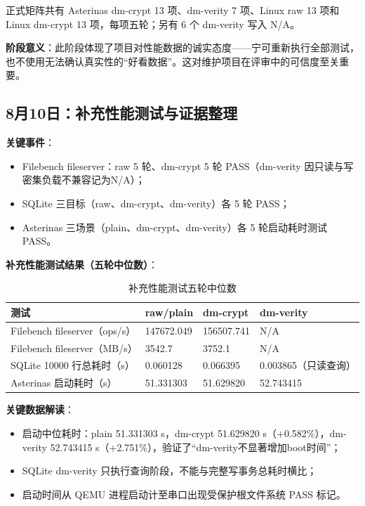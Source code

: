 正式矩阵共有 Asterinas dm-crypt 13 项、dm-verity 7 项、Linux raw 13 项和 Linux dm-crypt 13 项，每项五轮；另有 6 个 dm-verity 写入 N/A。

\textbf{阶段意义}：此阶段体现了项目对性能数据的诚实态度——宁可重新执行全部测试，也不使用无法确认真实性的“好看数据”。这对维护项目在评审中的可信度至关重要。

\subsection{8月10日：补充性能测试与证据整理}

\textbf{关键事件}：
\begin{itemize}
    \item Filebench fileserver：raw 5 轮、dm-crypt 5 轮 PASS（dm-verity 因只读与写密集负载不兼容记为N/A）；
    \item SQLite 三目标（raw、dm-crypt、dm-verity）各 5 轮 PASS；
    \item Asterinas 三场景（plain、dm-crypt、dm-verity）各 5 轮启动耗时测试 PASS。
\end{itemize}

\textbf{补充性能测试结果（五轮中位数）}：

\begin{table}[H]
    \centering
    \caption{补充性能测试五轮中位数}
    \begin{tabular}{p{}p{}p{}p{}}
        \toprule
        \textbf{测试} & \textbf{raw/plain} & \textbf{dm-crypt} & \textbf{dm-verity} \\
        \midrule
        Filebench fileserver（ops/s） & 147672.049 & 156507.741 & N/A \\
        Filebench fileserver（MB/s） & 3542.7 & 3752.1 & N/A \\
        SQLite 10000 行总耗时（s） & 0.060128 & 0.066395 & 0.003865（只读查询） \\
        Asterinas 启动耗时（s） & 51.331303 & 51.629820 & 52.743415 \\
        \bottomrule
    \end{tabular}
\end{table}

\textbf{关键数据解读}：
\begin{itemize}
    \item 启动中位耗时：plain 51.331303 s，dm-crypt 51.629820 s（+0.582\%），dm-verity 52.743415 s（+2.751\%），验证了“dm-verity不显著增加boot时间”；
    \item SQLite dm-verity 只执行查询阶段，不能与完整写事务总耗时横比；
    \item 启动时间从 QEMU 进程启动计至串口出现受保护根文件系统 PASS 标记。
\end{itemize}

